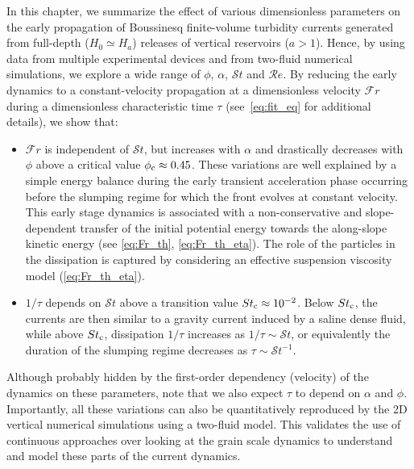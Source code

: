 \documentclass[12pt]{article}
\begin{document}
In this chapter, we summarize the effect of various dimensionless parameters on the early propagation of Boussinesq finite-volume turbidity currents generated from full-depth ($H_{0} \simeq H_{a}$) releases of vertical reservoirs ($a >1$). Hence, by using data from multiple experimental devices and from two-fluid numerical simulations, we explore a wide range of $\phi$, $\alpha$, $\mathcal{S}t$ and $\mathcal{R}e$.
%
By reducing the early dynamics to a constant-velocity propagation at a dimensionless velocity $\mathcal{F}r$ during a dimensionless characteristic time $\tau$ (see~\eqref{eq:fit_eq} for additional details), we show that:
\begin{itemize}
	\item $\mathcal{F}r$ is independent of $\mathcal{S}t$, but increases with $\alpha$ and drastically decreases with $\phi$ above a critical value $\phi_{\text c} \approx 0.45$. These variations are well explained by a simple energy balance during the early transient acceleration phase occurring before the slumping regime for which the front evolves at constant velocity. This early stage dynamics is associated with a non-conservative and slope-dependent transfer of the initial potential energy towards the along-slope kinetic energy (see \eqref{eq:Fr_th}, \eqref{eq:Fr_th_eta}). The role of the particles in the dissipation is captured by considering an effective suspension viscosity model (\eqref{eq:Fr_th_eta}).

	\item $1/\tau$ depends on $\mathcal{S}t$ above a transition value $St_{\text c} \approx 10^{-2}$. Below $St_{\text c}$, the currents are then similar to a gravity current induced by a saline dense fluid, while above $St_{\text c}$, dissipation $1/\tau$ increases as $1/\tau \sim \mathcal{S}t$, or equivalently the duration of the slumping regime decreases as $\tau \sim \mathcal{S}t^{-1}$.
\end{itemize}
Although probably hidden by the first-order dependency (velocity) of the dynamics on these parameters, note that we also expect $\tau$ to depend on $\alpha$ and $\phi$.
%
Importantly, all these variations can also be quantitatively reproduced by the 2D vertical numerical simulations using a two-fluid model. This validates the use of continuous approaches over looking at the grain scale dynamics to understand and model these parts of the current dynamics.

\end{document}
